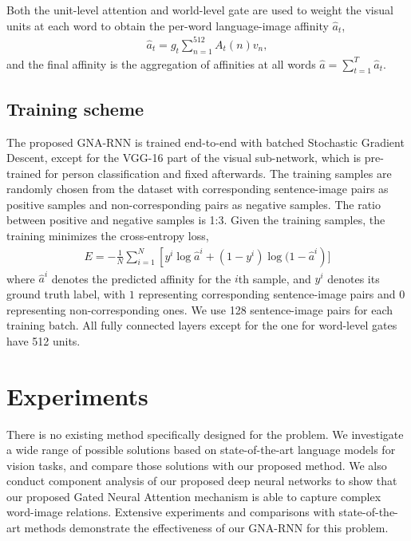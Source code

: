 Both the unit-level attention and world-level gate are used to weight the visual units at each word to obtain the per-word language-image affinity $\hat{a}_t$,
\begin{align} 
	\hat{a}_t = g_t \sum_{n=1}^{512}  A_t(n) v_n,
\end{align}
and the final affinity is the aggregation of affinities at all words $\hat{a} = \sum_{t=1}^T \hat{a}_t$.


\subsection{Training scheme}

The proposed GNA-RNN is trained end-to-end with batched Stochastic Gradient Descent, except for the VGG-16 part of the visual sub-network, which is pre-trained for person classification and fixed afterwards. The training samples are randomly chosen from the dataset with corresponding sentence-image pairs as positive samples and non-corresponding pairs as negative samples. The ratio between positive and negative samples is 1:3.
Given the training samples,
the training minimizes the cross-entropy loss,
\vspace{-5pt}
\begin{align}
	E = -\frac{1}{N}\sum_{i=1}^{N} \left[ y^i \log \hat{a}^i  + (1-y^i) \log (1-\hat{a}^i \right)]
\end{align}
where $\hat{a}^i$ denotes the predicted affinity for the $i$th sample, and $y^i$ denotes its ground truth label, with $1$ representing corresponding sentence-image pairs and $0$ representing non-corresponding ones.
We use 128 sentence-image pairs for each training batch. All fully connected layers except for the one for word-level gates have 512 units.



\section{Experiments}
\label{sec:ps-experiments}
There is no existing method specifically designed for the problem. We investigate a wide range of possible solutions based on state-of-the-art language models for vision tasks, and compare those solutions with our proposed method. We also conduct component analysis of our proposed deep neural networks to show that our proposed Gated Neural Attention mechanism is able to capture complex word-image relations. Extensive experiments and comparisons with state-of-the-art methods demonstrate the effectiveness of our GNA-RNN for this problem.

